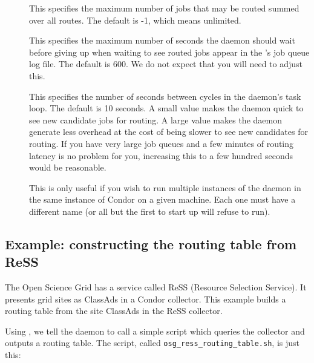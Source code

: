 \begin{description}
\item[] \label{JobRouterMaxJobs} This
specifies the maximum number of jobs that may be routed summed over
all routes.  The default is -1, which means unlimited.

\item[]
\label{MaxJobMirrorUpdateLag} This specifies the maximum number of
seconds the  daemon should wait before giving up when waiting to see
routed jobs appear in the 's job queue log file.  The
default is 600.  We do not expect that you will need to adjust this.

\item[]
\label{JobRouterPollingPeriod} This specifies the number of seconds
between cycles in the  daemon's task loop.  The default is 10
seconds.  A small value makes the  daemon quick to see new candidate
jobs for routing.  A large value makes the  daemon generate less
overhead at the cost of being slower to see new candidates for
routing.  If you have very large job queues and a few minutes of
routing latency is no problem for you, increasing this to a few
hundred seconds would be reasonable.

\item[] \label{JobRouterName} This is only
useful if you wish to run multiple instances of the  daemon in the same
instance of Condor on a given machine.  Each one must have a different
name (or all but the first to start up will refuse to run).

\end{description}

\subsection{Example: constructing the routing table from ReSS}
\label{JobRouterReSSExample}

The Open Science Grid has a service called ReSS (Resource Selection
Service).  It presents grid sites as ClassAds in a Condor collector.
This example builds a routing table from the site ClassAds in the ReSS
collector.

Using , we tell the  daemon to call a
simple script which queries the collector and outputs a routing table.
The script, called \verb|osg_ress_routing_table.sh|, is just this:

